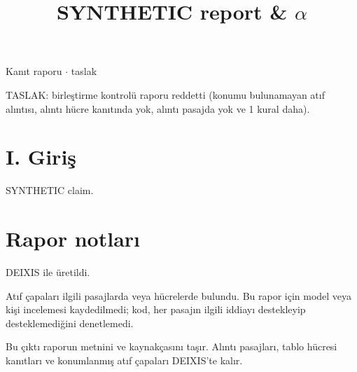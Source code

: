 \documentclass[journal]{IEEEtran}
\begin{document}
\renewcommand{\abstractname}{Özet}
\renewcommand{\IEEEkeywordsname}{Dizin Terimleri}
\renewcommand{\refname}{Kaynaklar}

\title{SYNTHETIC report \& \ensuremath{\alpha}}

\maketitle

\noindent Kanıt raporu \ensuremath{\cdot} taslak

\noindent TASLAK: birleştirme kontrolü raporu reddetti (konumu bulunamayan atıf alıntısı, alıntı hücre kanıtında yok, alıntı pasajda yok ve 1 kural daha).

\section*{I. Giriş}

SYNTHETIC claim. \cite{Synth26}

\section*{Rapor notları}

DEIXIS ile üretildi.

Atıf çapaları ilgili pasajlarda veya hücrelerde bulundu. Bu rapor için model veya kişi incelemesi kaydedilmedi; kod, her pasajın ilgili iddiayı destekleyip desteklemediğini denetlemedi.

Bu çıktı raporun metnini ve kaynakçasını taşır. Alıntı pasajları, tablo hücresi kanıtları ve konumlanmış atıf çapaları DEIXIS'te kalır.




\end{document}
